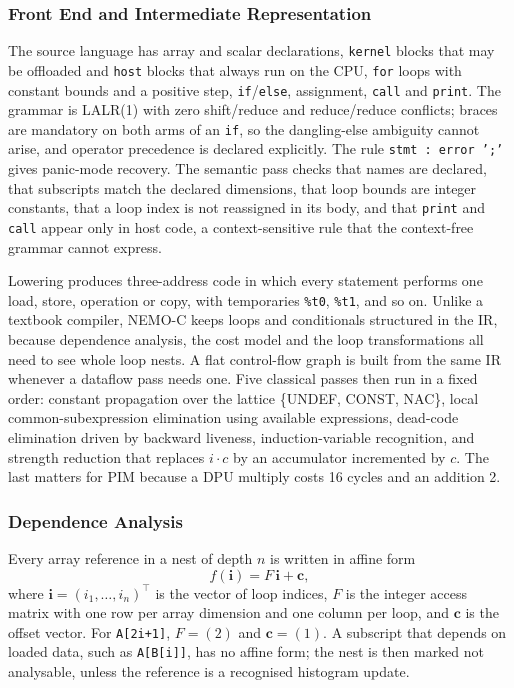 \documentclass{ieeeaccess}
\begin{document}
\subsubsection{Front End and Intermediate Representation}
The source language has array and scalar declarations, \texttt{kernel} blocks that may be offloaded and \texttt{host} blocks that always run on the CPU, \texttt{for} loops with constant bounds and a positive step, \texttt{if}/\texttt{else}, assignment, \texttt{call} and \texttt{print}. The grammar is LALR(1) with zero shift/reduce and reduce/reduce conflicts; braces are mandatory on both arms of an \texttt{if}, so the dangling-else ambiguity cannot arise, and operator precedence is declared explicitly. The rule \texttt{stmt : error ';'} gives panic-mode recovery. The semantic pass checks that names are declared, that subscripts match the declared dimensions, that loop bounds are integer constants, that a loop index is not reassigned in its body, and that \texttt{print} and \texttt{call} appear only in host code, a context-sensitive rule that the context-free grammar cannot express.

Lowering produces three-address code in which every statement performs one load, store, operation or copy, with temporaries \texttt{\%t0}, \texttt{\%t1}, and so on. Unlike a textbook compiler, NEMO-C keeps loops and conditionals structured in the IR, because dependence analysis, the cost model and the loop transformations all need to see whole loop nests. A flat control-flow graph is built from the same IR whenever a dataflow pass needs one. Five classical passes then run in a fixed order: constant propagation over the lattice \{UNDEF, CONST, NAC\}, local common-subexpression elimination using available expressions, dead-code elimination driven by backward liveness, induction-variable recognition, and strength reduction that replaces $i\cdot c$ by an accumulator incremented by $c$. The last matters for PIM because a DPU multiply costs 16 cycles and an addition 2.

\subsubsection{Dependence Analysis}
Every array reference in a nest of depth $n$ is written in affine form
\begin{equation}
f(\mathbf{i}) = F\,\mathbf{i} + \mathbf{c},
\label{eq:affine}
\end{equation}
where $\mathbf{i}=(i_1,\dots,i_n)^{\top}$ is the vector of loop indices, $F$ is the integer access matrix with one row per array dimension and one column per loop, and $\mathbf{c}$ is the offset vector. For \texttt{A[2i+1]}, $F=(2)$ and $\mathbf{c}=(1)$. A subscript that depends on loaded data, such as \texttt{A[B[i]]}, has no affine form; the nest is then marked not analysable, unless the reference is a recognised histogram update.
\end{document}
